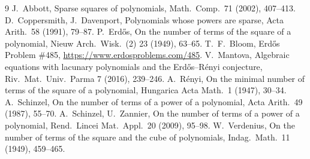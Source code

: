 \documentclass[11pt]{article}
\theoremstyle{remark}\newtheorem*{remark}{Remark}
\begin{document}
\begin{thebibliography}{9}\small
{} J.~Abbott, Sparse squares of polynomials, Math.\ Comp.\ 71 (2002), 407--413.
 D.~Coppersmith, J.~Davenport, Polynomials whose powers are sparse, Acta Arith.\ 58 (1991), 79--87.
 P.~Erd\H{o}s, On the number of terms of the square of a polynomial, Nieuw Arch.\ Wisk.\ (2) 23 (1949), 63--65.
 T.~F.~Bloom, Erd\H{o}s Problem \#485, \url{https://www.erdosproblems.com/485}.
 V.~Mantova, Algebraic equations with lacunary polynomials and the Erd\H{o}s--R\'enyi conjecture, Riv.\ Mat.\ Univ.\ Parma 7 (2016), 239--246.
 A.~R\'enyi, On the minimal number of terms of the square of a polynomial, Hungarica Acta Math.\ 1 (1947), 30--34.
 A.~Schinzel, On the number of terms of a power of a polynomial, Acta Arith.\ 49 (1987), 55--70.
 A.~Schinzel, U.~Zannier, On the number of terms of a power of a polynomial, Rend.\ Lincei Mat.\ Appl.\ 20 (2009), 95--98.
 W.~Verdenius, On the number of terms of the square and the cube of polynomials, Indag.\ Math.\ 11 (1949), 459--465.
\end{thebibliography}
\end{document}
